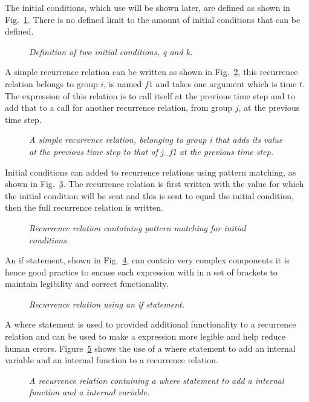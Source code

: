 \documentclass{article}
\begin{document}
The initial conditions, which use will be shown later, are defined as shown in Fig.~\ref{fig:3exofla}. There is no defined  limit to the amount of initial conditions that can be defined. 
\begin{figure}[H]
	\centering
	
	\caption{\it Definition of two initial conditions, q and k.}
	\label{fig:3exofla}
\end{figure} 
 
A simple recurrence relation can be written as shown in Fig.~\ref{fig:4exofla}, this recurrence relation belongs to group $i$, is named $f1$ and takes one argument which is time $t$. The expression of this relation is to call itself at the previous time step and to add that to a call for another recurrence relation, from group $j$, at the previous time step. 
\begin{figure}[H]
	\centering
	
	\caption{\it A simple recurrence relation, belonging to group i that adds its value at the previous time step to that of j\_f1 at the previous time step.}
	\label{fig:4exofla}
\end{figure} 
 
Initial conditions can added to recurrence relations using pattern matching, as shown in Fig.~\ref{fig:5exofla}. The recurrence relation is first written with the value for which the initial condition will be sent and this is sent to equal the initial condition, then the full recurrence relation is written.  
\begin{figure}[H]
	\centering
	
	\caption{\it Recurrence relation containing pattern matching for initial conditions.}
	\label{fig:5exofla}
\end{figure} 
 
An if statement, shown in Fig.~\ref{fig:6exofla}, can contain very complex components it is hence good practice to encase each expression with in a set of brackets to maintain legibility and correct functionality.  
\begin{figure}[H]
	\centering
	
	\caption{\it Recurrence relation using an if statement.}
	\label{fig:6exofla}
\end{figure} 
 
A where statement is used to provided additional functionality to a recurrence relation and can be used to make a expression more legible and help reduce human errors. Figure~\ref{fig:7exofla} shows the use of a where statement to add an internal variable and an internal function to a recurrence relation. 
\begin{figure}[H]
	\centering
	
	\caption{\it A recurrence relation containing a where statement to add a internal function and a internal variable.}
	\label{fig:7exofla}
\end{figure} 
\end{document}
